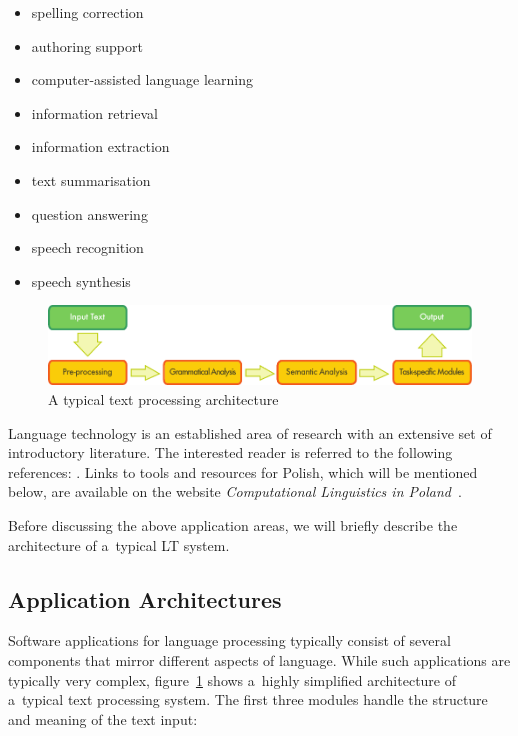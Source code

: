 \begin{multicols}{2}
\begin{itemize} \item spelling correction \item authoring support
\item computer-assisted language learning \item information retrieval
\item information extraction \item text summarisation \item question
answering \item speech recognition \item speech synthesis
\end{itemize} 

\begin{figure}[b]  \center
\includegraphics[width=\textwidth]{../_media/english/text_processing_app_architecture}
\caption{A typical text processing architecture} \label{fig:
textprocessingarch_en} 
\end{figure} 

Language technology is an established area of research with an
extensive set of introductory literature. The interested reader is
referred to the following references: \cite{jurafsky-martin01,
manning-schuetze1, lt-world1, lt-survey1, mykowiecka1}. Links to tools
and resources for Polish, which will be mentioned below, are available
on the website \textit{Computational Linguistics in
Poland}~\cite{Clip2}. 

Before discussing the above application areas, we will briefly
describe the architecture of a~typical LT system. 

\subsection{Application Architectures} 

Software applications for language processing typically consist of
several components that mirror different aspects of language. While
such applications are typically very complex, figure~\ref{fig:
textprocessingarch_en} shows a~highly simplified architecture of
a~typical text processing system. The first three modules handle the
structure and meaning of the text input: 


\end{multicols}
